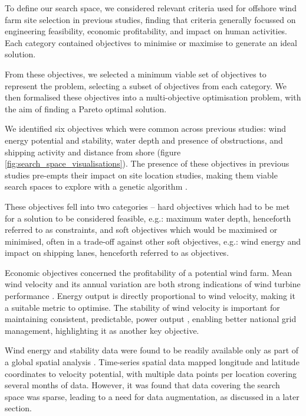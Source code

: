 \documentclass[preprint,12pt]{elsarticle}
\begin{document}
To define our search space, we considered relevant criteria used for offshore wind farm site selection in previous studies, finding that criteria generally focussed on engineering feasibility, economic profitability, and impact on human activities. Each category contained objectives to minimise or maximise to generate an ideal solution.

From these objectives, we selected a minimum viable set of objectives to represent the problem, selecting a subset of objectives from each category. We then formalised these objectives into a multi-objective optimisation problem, with the aim of finding a Pareto optimal solution.

We identified six objectives which were common across previous studies: wind energy potential and stability, water depth and presence of obstructions, and shipping activity and distance from shore (figure \ref{fig:search_space_visualisations}). The presence of these objectives in previous studies pre-empts their impact on site location studies, making them viable search spaces to explore with a genetic algorithm \cite{Kim2016}. 

These objectives fell into two categories – hard objectives which had to be met for a solution to be considered feasible, e.g.: maximum water depth, henceforth referred to as constraints, and soft objectives which would be maximised or minimised, often in a trade-off against other soft objectives, e.g.: wind energy and impact on shipping lanes, henceforth referred to as objectives.

Economic objectives concerned the profitability of a potential wind farm. Mean wind velocity and its annual variation are both strong indications of wind turbine performance \cite{punt2009spatial}. Energy output is directly proportional to wind velocity, making it a suitable metric to optimise. The stability of wind velocity is important for maintaining consistent, predictable, power output \cite{NYSERDA2021}, enabling better national grid management, highlighting it as another key objective.

Wind energy and stability data were found to be readily available only as part of a global spatial analysis \cite{2022a}\cite{Kalnay1996}. Time-series spatial data mapped longitude and latitude coordinates to velocity potential, with multiple data points per location covering several months of data. However, it was found that data covering the search space was sparse, leading to a need for data augmentation, as discussed in a later section.
\end{document}
